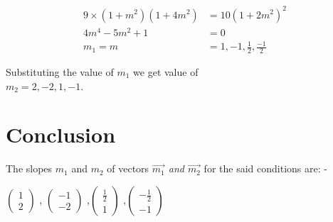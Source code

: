 \documentclass[conference]{IEEEtran}
\newcommand{\myvec}[1]{\ensuremath{\begin{pmatrix}#1\end{pmatrix}}}
\begin{document}
\begin{align}
9 \times (1 + m^2) (1 + 4 m^2) & = 10 ( 1 + 2 m^2)^2\\ 
4 m^4 - 5 m^2 + 1 &=0\\ 
m_{1} = m &= 1, -1,\frac{1}{2},\frac{-1}{2}
\end{align}

Substituting the value of $ m_{1}$ we get value of\\
$ m_{2} = 2, -2, 1, -1$.\\

\section{Conclusion}
The slopes $ m_{1}$ and $ m_{2} $ of vectors \textit{$\vec{m_{1}}$  and    $\vec{m_{2}}$} for the said conditions are: -
 \begin{center}
\myvec{1 \\ 2} , \myvec{-1 \\ -2} ,\myvec{ \frac{1}{2}\\1} ,\myvec{- \frac{1}{2}\\ -1}
\end{center}
\end{document}
